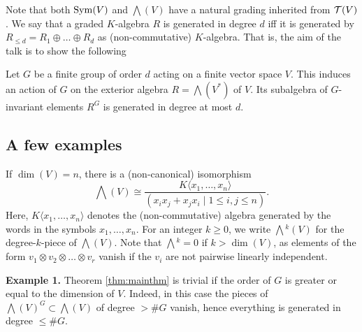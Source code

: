 \documentclass[../main.tex]{subfiles}
\begin{document}
Note that both $\operatorname{Sym}(V)$ and $\bigwedge(V)$ have a natural grading inherited from
$\mathcal{T}(V)$. 
We say that a graded $K$-algebra $R$ is generated in degree $d$ iff it is
generated by $R_{\leq d} = R_1 \oplus \dots \oplus R_d$ as (non-commutative)
$K$-algebra.  That is, the aim of the talk is to show the following 
\begin{thm}\label{thm:mainthm}
    Let $G$ be a finite group of order $d$ acting on a finite vector space $V$.
    This induces an action of $G$ on the exterior algebra $R = \bigwedge(V^*)$ of $V$.
    Its subalgebra of $G$-invariant elements $R^G$ is generated in
    degree at most $d$.
\end{thm}

\subsection{A few examples} %
\label{sub:Some examples}
If $\dim(V) = n$, there is a (non-canonical) isomorphism
\begin{equation*}
    \bigwedge(V) \cong \frac{K\langle x_1, \dots, x_n \rangle}{(x_i x_j + x_j
    x_i \mid 1 \leq i,j \leq n)}.
\end{equation*}
Here, $K\langle x_1, \dots, x_n \rangle$ denotes the (non-commutative) algebra generated
by the words in the symbols $x_1, \dots, x_n$.
For an integer $k \geq 0$, we write $\bigwedge{}^k(V)$ for the degree-$k$-piece of 
$\bigwedge(V)$. Note that $\bigwedge{}^k = 0$ if $k > \dim(V)$, as elements of
the form $v_1 \otimes v_2 \otimes \dots \otimes v_r$ vanish if the $v_i$ are not
pairwise linearly independent. 

\textbf{Example 1.} Theorem \ref{thm:mainthm} is trivial if the order of $G$ is greater
or equal to the dimension of $V$. Indeed, in this case the pieces of
$\bigwedge(V)^G \subset \bigwedge(V)$ of degree $>\# G$ vanish, hence
everything is generated in degree $\leq \# G$.
\end{document}
